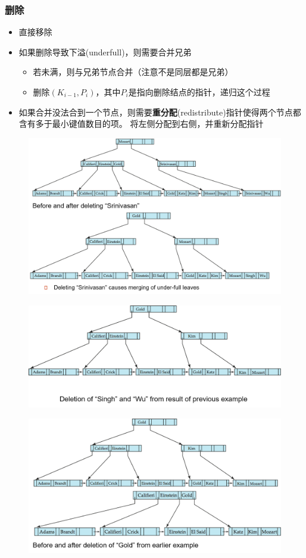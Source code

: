 \subsubsection{删除}
\begin{itemize}
	\item 直接移除
	\item 如果删除导致下溢(underfull)，则需要合并兄弟
	\begin{itemize}
		\item 若未满，则与兄弟节点合并（注意不是同层都是兄弟）
		\item 删除$(K_{i-1},P_i)$，其中$P_i$是指向删除结点的指针，递归这个过程
	\end{itemize}
	\item 如果合并没法合到一个节点，则需要\textbf{重分配}(redistribute)指针使得两个节点都含有多于最小键值数目的项。
	将左侧分配到右侧，并重新分配指针
\end{itemize}
\begin{figure}[H]
\centering
\includegraphics[width=0.8\linewidth]{fig/bp-tree_deletion.png}
\end{figure}
\begin{figure}[H]
\centering
\includegraphics[width=0.8\linewidth]{fig/bp-tree_deletion2.png}
\end{figure}
\begin{figure}[H]
\centering
\includegraphics[width=0.8\linewidth]{fig/bp-tree_deletion3.png}
\end{figure}

